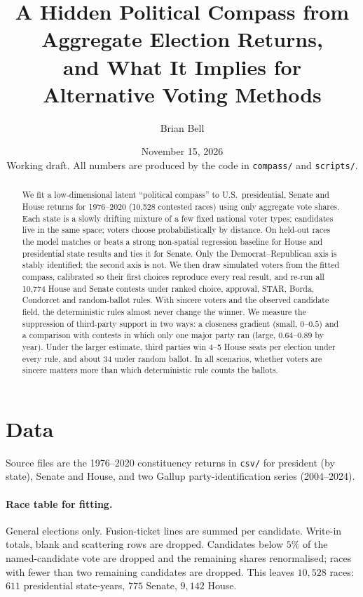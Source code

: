 \documentclass[11pt]{article}
\title{A Hidden Political Compass from Aggregate Election Returns,\\ and What It Implies for Alternative Voting Methods}
\author{Brian Bell}
\date{November 15, 2026 \\[2pt] \small Working draft. All numbers are produced by the code in \texttt{compass/} and \texttt{scripts/}.}
\begin{document}
\maketitle

\begin{abstract}
We fit a low-dimensional latent ``political compass'' to U.S.\ presidential, Senate and House returns for 1976--2020 (10{,}528 contested races) using only aggregate vote shares. Each state is a slowly drifting mixture of a few fixed national voter types; candidates live in the same space; voters choose probabilistically by distance. On held-out races the model matches or beats a strong non-spatial regression baseline for House and presidential state results and ties it for Senate. Only the Democrat--Republican axis is stably identified; the second axis is not. We then draw simulated voters from the fitted compass, calibrated so their first choices reproduce every real result, and re-run all 10{,}774 House and Senate contests under ranked choice, approval, STAR, Borda, Condorcet and random-ballot rules. With sincere voters and the observed candidate field, the deterministic rules almost never change the winner. We measure the suppression of third-party support in two ways: a closeness gradient (small, $0$--$0.5$) and a comparison with contests in which only one major party ran (large, $0.64$--$0.89$ by year). Under the larger estimate, third parties win 4--5 House seats per election under every rule, and about 34 under random ballot. In all scenarios, whether voters are sincere matters more than which deterministic rule counts the ballots.
\end{abstract}

\tableofcontents

\section{Data}
\label{sec:data}
Source files are the 1976--2020 constituency returns in \texttt{csv/} for president (by state), Senate and House, and two Gallup party-identification series (2004--2024).

\paragraph{Race table for fitting.} General elections only. Fusion-ticket lines are summed per candidate. Write-in totals, blank and scattering rows are dropped. Candidates below $5\%$ of the named-candidate vote are dropped and the remaining shares renormalised; races with fewer than two remaining candidates are dropped. This leaves $10{,}528$ races: $611$ presidential state-years, $775$ Senate, $9{,}142$ House.
\end{document}
